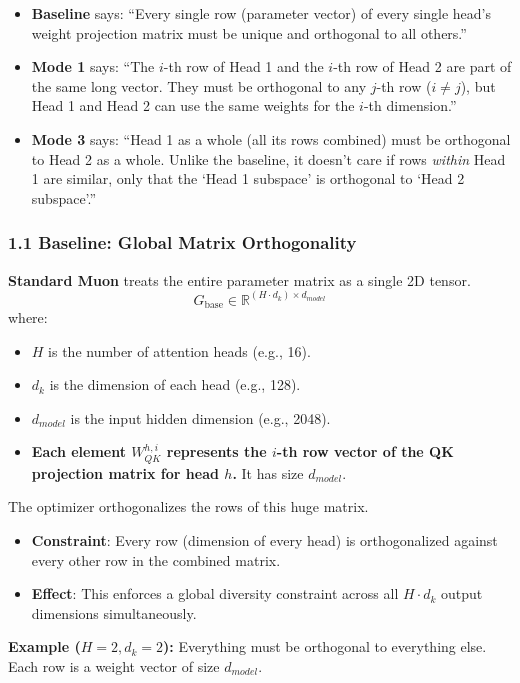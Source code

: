 \documentclass[12pt]{article}
\begin{document}
\begin{itemize}
    \item \textbf{Baseline} says: ``Every single row (parameter vector) of every single head's weight projection matrix must be unique and orthogonal to all others.''
    \item \textbf{Mode 1} says: ``The $i$-th row of Head 1 and the $i$-th row of Head 2 are part of the same long vector. They must be orthogonal to any $j$-th row ($i \neq j$), but Head 1 and Head 2 can use the same weights for the $i$-th dimension.''
    \item \textbf{Mode 3} says: ``Head 1 as a whole (all its rows combined) must be orthogonal to Head 2 as a whole. Unlike the baseline, it doesn't care if rows \textit{within} Head 1 are similar, only that the `Head 1 subspace' is orthogonal to `Head 2 subspace'.''
\end{itemize}

\subsubsection*{1.1 Baseline: Global Matrix Orthogonality}
\textbf{Standard Muon} treats the entire parameter matrix as a single 2D tensor.
$$G_{\text{base}} \in \mathbb{R}^{(H \cdot d_k) \times d_{model}}$$
where:
\begin{itemize}
    \item $H$ is the number of attention heads (e.g., 16).
    \item $d_k$ is the dimension of each head (e.g., 128).
    \item $d_{model}$ is the input hidden dimension (e.g., 2048).
    \item \textbf{Each element $W_{QK}^{h,i}$ represents the $i$-th row vector of the QK projection matrix for head $h$.} It has size $d_{model}$.
\end{itemize}

The optimizer orthogonalizes the rows of this huge matrix.
\begin{itemize}
    \item \textbf{Constraint}: Every row (dimension of every head) is orthogonalized against every other row in the combined matrix.
    \item \textbf{Effect}: This enforces a global diversity constraint across all $H \cdot d_k$ output dimensions simultaneously.
\end{itemize}

\textbf{Example ($H=2, d_k=2$):}
Everything must be orthogonal to everything else. Each row is a weight vector of size $d_{model}$.
\end{document}
